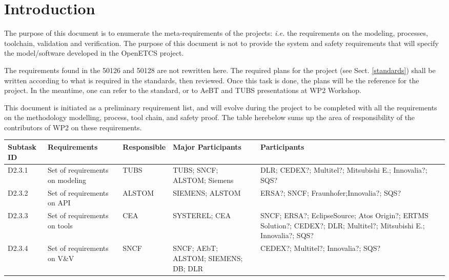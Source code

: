 \documentclass{template/openetcs_article}
\begin{document}
\newenvironment{comment}{
	\begin{quote}
	\begin{itshape}Comment. 
}{
	\end{itshape}
	\end{quote}
}

\newenvironment{justif}{
	\begin{quote}
	\begin{itshape}Justification. 
}{
	\end{itshape}
	\end{quote}
}


\def\reqt{R-WP2/D2.3.0}
\section{Introduction}
The purpose of this document is to enumerate the meta-requirements of the projects: \emph{i.e.} 
the requirements on the modeling, processes, toolchain, validation and verification. The purpose of this document is 
not to provide the system and safety requirements that will specify the model/software 
developed in the OpenETCS project.

The requirements found in the 50126 and 50128 are not rewritten here. The required plans for the 
project (see Sect. \ref{standards}) shall be written according to what is required in the standards,
then reviewed. Once this task is done, the plans will be the reference for the project.
In the meantime, one can refer to the standard, or to AeBT and TUBS presentations at WP2 Workshop.

This document is initiated as a preliminary requirement list, and will evolve during the project 
to be completed with all the requirements on the methodology
modelling, process, tool chain, and safety proof. The table herebelow sums up the area of responsibility
of the contributors of WP2 on these requirements.

\small
\begin{tabular}{|p{1.1cm}|p{1.8cm}|p{1.8cm}|p{3.2cm}|p{4.2cm}|}
\hline
Subtask ID & Requirements & Responsible & Major Participants & Participants \\
\hline
D2.3.1 & Set of requirements on modeling & TUBS & TUBS; SNCF; ALSTOM; Siemens & 
DLR; CEDEX?; Multitel?; Mitsubishi E.; Innovalia?; SQS? \\
\hline
D2.3.2 & Set of requirements on API & ALSTOM & SIEMENS; ALSTOM & 
ERSA?; SNCF; Fraunhofer;Innovalia?; SQS? \\
\hline
D2.3.3 &  Set of requirements on tools & CEA & SYSTEREL; CEA & 
SNCF; ERSA?; EclipseSource; Atos Origin?; ERTMS Solution?; CEDEX?; DLR; 
Multitel?; Mitsubishi E.; Innovalia?; SQS? \\
\hline
D2.3.4 & Set of requirements on V\&V & SNCF & SNCF; AEbT; ALSTOM; SIEMENS; DB; DLR & 
CEDEX?; Multitel?; Innovalia?; SQS? \\ 
\hline
\end{tabular}
\normalsize
\end{document}
